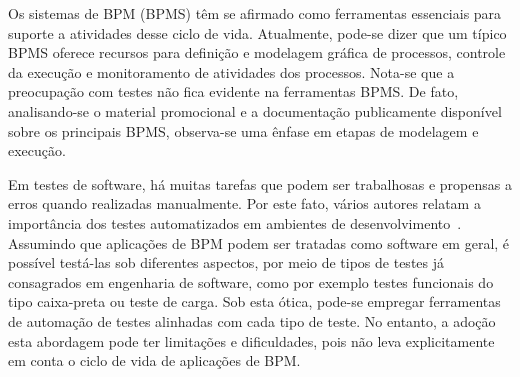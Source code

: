 \documentclass[12pt]{article}
\begin{document}

Os sistemas de BPM (BPMS) têm se afirmado como ferramentas essenciais para suporte a atividades desse ciclo de vida. Atualmente, pode-se dizer que um típico BPMS oferece recursos para definição e modelagem gráfica de processos, controle da execução e monitoramento de atividades dos processos. Nota-se que a preocupação com testes não fica evidente na ferramentas BPMS. De fato, analisando-se o material promocional e a documentação publicamente disponível sobre os principais BPMS, observa-se uma ênfase em etapas de modelagem e execução.



Em testes de software, há muitas tarefas que podem ser trabalhosas e propensas a erros quando realizadas manualmente. Por este fato, vários autores relatam a importância dos testes automatizados em ambientes de desenvolvimento~\cite{sbqs2013}. Assumindo que aplicações de BPM podem ser tratadas como software em geral, é possível testá-las sob diferentes aspectos, por meio de tipos de testes já consagrados em engenharia de software, como por exemplo testes funcionais do tipo caixa-preta ou teste de carga. Sob esta ótica, pode-se empregar ferramentas de automação de testes alinhadas com cada tipo de teste. No entanto, a adoção esta abordagem pode ter limitações e dificuldades, pois não leva explicitamente em conta o ciclo de vida de aplicações de BPM.
\end{document}
